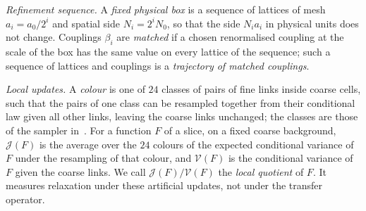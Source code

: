 \emph{Refinement sequence.} A \emph{fixed physical box} is a sequence of lattices of mesh $a_i=a_0/2^i$ and
spatial side $N_i=2^iN_0$, so that the side $N_ia_i$ in physical units does not change. Couplings $\beta_i$ are
\emph{matched} if a chosen renormalised coupling at the scale of the box has the same value on every lattice
of the sequence; such a sequence of lattices and couplings is a \emph{trajectory of matched couplings}.

\emph{Local updates.} A \emph{colour} is one of $24$ classes of pairs of fine links inside coarse cells, such
that the pairs of one class can be resampled together from their conditional law given all other links,
leaving the coarse links unchanged; the classes are those of the sampler in~\cite{RepoData}. For a function
$F$ of a slice, on a fixed coarse background, $\mathcal J(F)$ is the average over the $24$ colours of the
expected conditional variance of $F$ under the resampling of that colour, and $\mathcal V(F)$ is the
conditional variance of $F$ given the coarse links. We call $\mathcal J(F)/\mathcal V(F)$ the \emph{local
quotient} of $F$. It measures relaxation under these artificial updates, not under the transfer operator.

